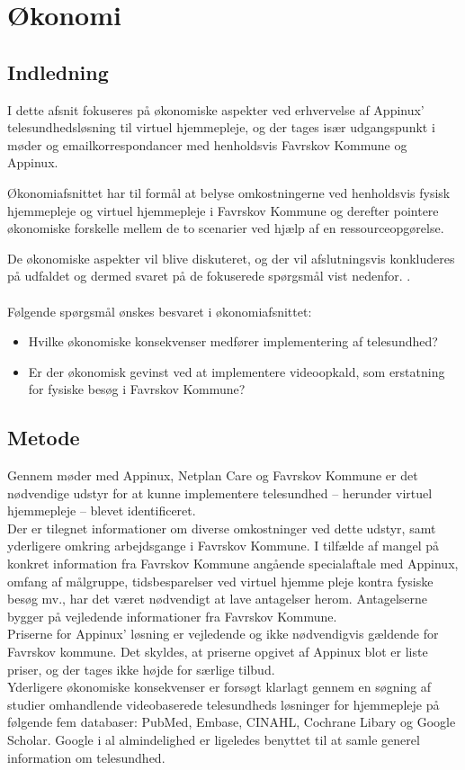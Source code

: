 \chapter{Økonomi}
\section{Indledning}
I dette afsnit fokuseres på økonomiske aspekter ved erhvervelse af Appinux’ telesundhedsløsning til virtuel hjemmepleje, og der tages især udgangspunkt i møder og emailkorrespondancer med henholdsvis Favrskov Kommune og Appinux. 

Økonomiafsnittet har til formål at belyse omkostningerne ved henholdsvis fysisk hjemmepleje og virtuel hjemmepleje i Favrskov Kommune og derefter pointere økonomiske forskelle mellem de to scenarier ved hjælp af en ressourceopgørelse.

De økonomiske aspekter vil blive diskuteret, og der vil afslutningsvis konkluderes på udfaldet og dermed svaret på de fokuserede spørgsmål vist nedenfor.
.\\ \\
Følgende spørgsmål ønskes besvaret i økonomiafsnittet:
\begin{itemize}
	\item Hvilke økonomiske konsekvenser medfører implementering af telesundhed?
	\item Er der økonomisk gevinst ved at implementere videoopkald, som erstatning for fysiske besøg i Favrskov Kommune?
\end{itemize}

\section{Metode}
Gennem møder med Appinux, Netplan Care og Favrskov Kommune er det nødvendige udstyr for at kunne implementere telesundhed – herunder virtuel hjemmepleje – blevet identificeret.\\
Der er tilegnet informationer om diverse omkostninger ved dette udstyr, samt yderligere omkring arbejdsgange i Favrskov Kommune. 
I tilfælde af mangel på konkret information fra Favrskov Kommune angående specialaftale med Appinux, omfang af målgruppe, tidsbesparelser ved virtuel hjemme pleje kontra fysiske besøg mv., har det været nødvendigt at lave antagelser herom. Antagelserne bygger på vejledende informationer fra Favrskov Kommune.\\
Priserne for Appinux’ løsning er vejledende og ikke nødvendigvis gældende for Favrskov kommune. Det skyldes, at priserne opgivet af Appinux blot er liste priser, og der tages ikke højde for særlige tilbud.\\
Yderligere økonomiske konsekvenser er forsøgt klarlagt gennem en søgning af studier omhandlende videobaserede telesundheds løsninger for hjemmepleje på følgende fem databaser: PubMed, Embase, CINAHL, Cochrane Libary og Google Scholar. Google i al almindelighed er ligeledes benyttet til at samle generel information om telesundhed. 


